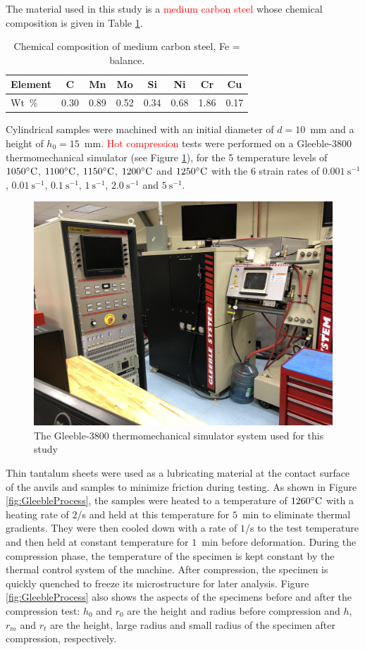 \documentclass[twoside,english,1p,final,sort&compress]{elsarticle}
\theoremstyle{plain}
\DeclareRobustCommand{\ps}{\text{s}^{-1}}
\begin{document}
The material used in this study is a \textcolor{red}{medium carbon steel} whose chemical composition is given in Table \ref{tab:Composition}.
\begin{table}[h!]
\centering
\caption{Chemical composition of medium carbon steel, Fe = balance.}
\begin{tabular}{lccccccc}
	\hline
	Element &  C   &  Mn  &  Mo  &  Si  &  Ni  &  Cr  &  Cu  \\ \hline
	Wt~\%   & 0.30 & 0.89 & 0.52 & 0.34 & 0.68 & 1.86 & 0.17 \\ \hline
\end{tabular}
\label{tab:Composition}
\end{table}
Cylindrical samples were machined with an initial diameter of $d=10$~mm and a height of $h_0=15$~mm.
\textcolor{red}{Hot compression} tests were performed on a Gleeble-3800 thermomechanical simulator (see Figure \ref{fig:Gleeble3800}), for the 5 temperature levels of $1050\celsius$, $1100\celsius$, $1150\celsius$, $1200\celsius$ and $1250\celsius$ with the 6 strain rates of $0.001~\ps$, $0.01~\ps$, $0.1~\ps$, $1~\ps$, $2.0~\ps$ and $5~\ps$.
\begin{figure}[!ht]
\centering
\includegraphics[width=0.7\columnwidth]{Figures/Gleeble-3800}
\caption{The Gleeble-3800 thermomechanical simulator system used for this study}
\label{fig:Gleeble3800}
\end{figure}
Thin tantalum sheets were used as a lubricating material at the contact surface of the anvils and samples to minimize friction during testing. As shown in Figure \ref{fig:GleebleProcess}, the samples were heated to a temperature of $1260\celsius$ with a heating rate of $2$\celsius/s and held at this temperature for $5$~min to eliminate thermal gradients. They were then cooled down with a rate of $1$\celsius/s to the test temperature and then held at constant temperature for $1$~min before deformation. During the compression phase, the temperature of the specimen is kept constant by the thermal control system of the machine. After compression, the specimen is quickly quenched to freeze its microstructure for later analysis. Figure \ref{fig:GleebleProcess} also shows the aspects of the specimens before and after the compression test: $h_0$ and $r_0$ are the height and radius before compression and $h$, $r_m$ and $r_t$ are the height, large radius and small radius of the specimen after compression, respectively.
\end{document}

